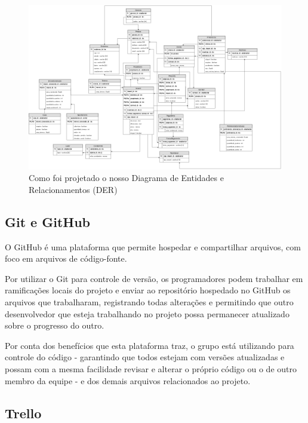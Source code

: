 \documentclass[a4paper,11pt,fleqn]{article}
\begin{document}
\begin{figure}[h!]
  \begin{center}
    \includegraphics[scale=0.4]{imagens/der.png}
  \end{center}
  \caption{Como foi projetado o nosso Diagrama de Entidades e Relacionamentos (DER)}
  \label{f:trello}
\end{figure}


\subsection{Git e GitHub}
\label{ss:github}

O GitHub é uma plataforma que permite hospedar e compartilhar arquivos, com foco em arquivos de código-fonte.

Por utilizar o Git para controle de versão, os programadores podem trabalhar em ramificações locais do projeto e enviar ao repositório hospedado no GitHub os arquivos
 que trabalharam, registrando todas alterações e permitindo que outro desenvolvedor que esteja trabalhando no projeto possa permanecer atualizado sobre o progresso
  do outro.

Por conta dos benefícios que esta plataforma traz, o grupo está utilizando para controle do código - garantindo que todos estejam com versões atualizadas
 e possam com a mesma facilidade revisar e alterar o próprio código ou o de outro membro da equipe - e dos demais arquivos relacionados ao projeto. 

\subsection{Trello}
\label{ss:trello}
\end{document}
